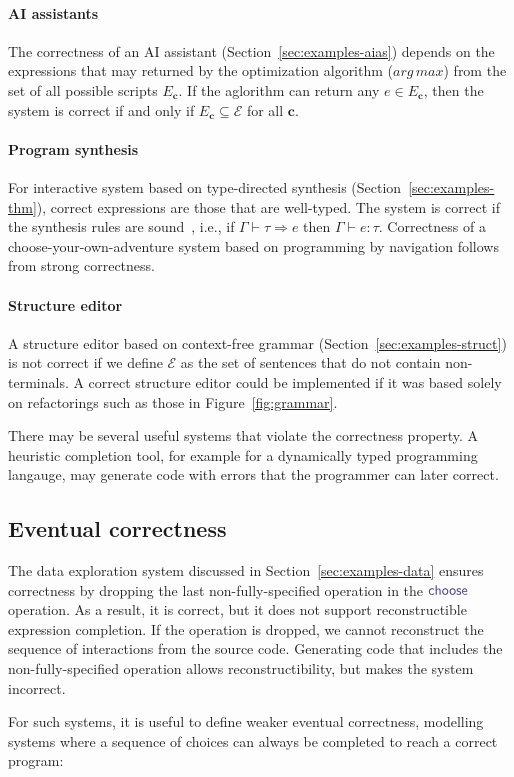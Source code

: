 \documentclass[nonacm,anonymous,sigplan,screen]{acmart}
\newcommand{\ident}[1]{\textsf{\color{DarkSlateBlue}{#1}}}
\newcommand{\select}{\textnormal{\ident{choose}}}
\newcommand{\mparagraph}[1]{\vspace{-0.25em}\paragraph{#1}}
\begin{document}
\mparagraph{AI assistants}
The correctness of an AI assistant (Section~\ref{sec:examples-aias}) depends on the
expressions that may returned by the optimization algorithm ($\mathit{arg\,max}$) from the
set of all possible scripts $E_{\boldsymbol{c}}$. If the aglorithm can return any $e \in E_{\boldsymbol{c}}$,
then the system is correct if and only if $E_{\boldsymbol{c}}\subseteq\mathcal{E}$ for all
 $\boldsymbol{c}$.

\mparagraph{Program synthesis}
For interactive system based on type-directed synthesis (Section~\ref{sec:examples-thm}),
correct expressions are those that are well-typed. The system is correct if the synthesis rules
are sound~\cite{osera-2015-synthesis}, i.e., if $\Gamma\!\vdash\!\tau\!\Rightarrow e$ then
$\Gamma\!\vdash\!e\!:\!\tau$. Correctness of a choose-your-own-adventure system based on programming
by navigation \cite{lubin-2025-pbn} follows from strong correctness.

\mparagraph{Structure editor}
A structure editor based on context-free grammar (Section~\ref{sec:examples-struct})
is not correct if we define $\mathcal{E}$ as the set of sentences that do not contain
non-terminals. A correct structure editor could be implemented if it was based
solely on refactorings such as those in Figure~\ref{fig:grammar}.
\vspace{0.5em}

There may be several useful systems that violate the correctness property. A heuristic completion
tool, for example for a dynamically typed programming langauge, may generate code with errors
that the programmer can later correct.

\subsection{Eventual correctness}
The data exploration system discussed in Section~\ref{sec:examples-data} ensures correctness
by dropping the last non-fully-specified operation in the $\select$ operation. As a result, it is
correct, but it does not support reconstructible expression completion. If the operation is dropped,
we cannot reconstruct the sequence of interactions from the source code. Generating code
that includes the non-fully-specified operation allows reconstructibility, but makes the system
incorrect.

For such systems, it is useful to define weaker eventual correctness, modelling
systems where a sequence of choices can always be completed to reach a correct program:
\end{document}
